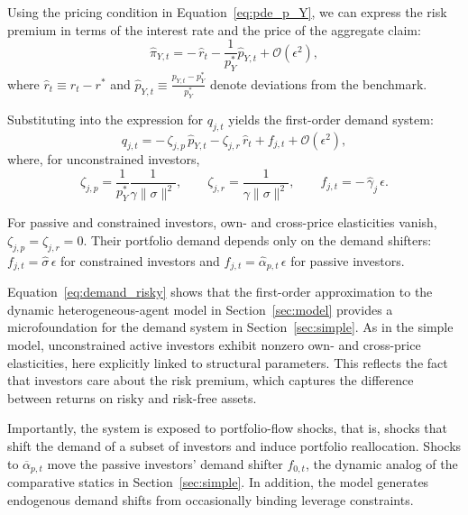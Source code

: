 \documentclass[12pt,english]{article}
\begin{document}
Using the pricing condition in Equation~\eqref{eq:pde_p_Y}, we can express the risk premium in terms of the interest rate and the price of the aggregate claim:
\begin{equation}
    \hat{\pi}_{Y,t}
    =
    -\,\hat{r}_t
    -
    \frac{1}{p_Y^{*}}\hat{p}_{Y,t}
    +
    \mathcal{O}(\epsilon^2),
\end{equation}
where $\hat{r}_t\equiv r_t-r^{*}$ and
$\hat{p}_{Y,t}\equiv \frac{p_{Y,t}-p_Y^{*}}{p_Y^{*}}$
denote deviations from the benchmark.

Substituting into the expression for $q_{j,t}$ yields the first-order demand system:
\begin{equation}\label{eq:demand_risky}
    q_{j,t}
    =
    -\,\zeta_{j,p}\,\hat{p}_{Y,t}
    -
    \zeta_{j,r}\,\hat{r}_t
    +
    f_{j,t}
    +
    \mathcal{O}(\epsilon^2),
\end{equation}
where, for unconstrained investors,
\begin{equation}
    \zeta_{j,p}
    =
    \frac{1}{p_Y^{*}}\frac{1}{\gamma\|\sigma\|^2},
    \qquad
    \zeta_{j,r}
    =
    \frac{1}{\gamma\|\sigma\|^2},
    \qquad
    f_{j,t}
    =
    -\,\hat{\gamma}_j\,\epsilon.
\end{equation}

For passive and constrained investors, own- and cross-price elasticities vanish, $\zeta_{j,p}=\zeta_{j,r}=0$.
Their portfolio demand depends only on the demand shifters:
$f_{j,t}=\hat{\sigma}\,\epsilon$ for constrained investors and
$f_{j,t}=\hat{\alpha}_{p,t}\,\epsilon$ for passive investors.

Equation~\eqref{eq:demand_risky} shows that the first-order approximation to the dynamic heterogeneous-agent model in Section~\ref{sec:model} provides a microfoundation for the demand system in Section~\ref{sec:simple}.
As in the simple model, unconstrained active investors exhibit nonzero own- and cross-price elasticities, here explicitly linked to structural parameters.
This reflects the fact that investors care about the risk premium, which captures the difference between returns on risky and risk-free assets.

Importantly, the system is exposed to portfolio-flow shocks, that is, shocks that shift the demand of a subset of investors and induce portfolio reallocation.
Shocks to $\overline{\alpha}_{p,t}$ move the passive investors’ demand shifter $f_{0,t}$, the dynamic analog of the comparative statics in Section~\ref{sec:simple}.
In addition, the model generates endogenous demand shifts from occasionally binding leverage constraints.
\end{document}

